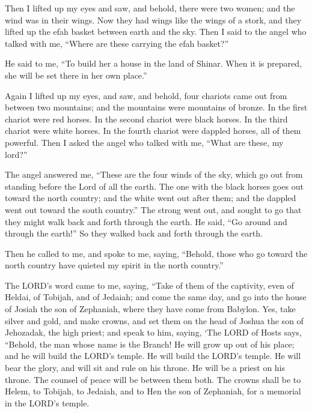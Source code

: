 \myverse{}Then I lifted up my eyes and saw, and behold, there were two women;
and the wind was in their wings. Now they had wings like the wings of a stork, and they lifted up the
efah basket between earth and the sky.
\myverse{}Then I said to the angel who talked with me, “Where are these carrying the
efah basket?”

\myverse{}He said to me, “To build her a house in the land of Shinar. When
it is prepared, she will be set there in her own place.”


\mychapter{} \myverse*{}Again I lifted up my eyes, and saw, and behold, four chariots came
out from between two mountains; and the mountains were mountains of bronze.
\myverse{}In the first chariot were red horses. In the second chariot were black horses.
\myverse{}In the third chariot were white horses. In the fourth chariot were dappled horses,
all of them powerful.
\myverse{}Then I asked the angel who talked with me, “What are these, my lord?”

\myverse{}The angel answered me, “These are the four winds of the sky, which
go out from standing before the Lord of all the earth.
\myverse{}The one with the black horses goes out toward the north country; and the white
went out after them; and the dappled went out toward the south country.”
\myverse{}The strong went out, and sought to go that they might walk back and forth through
the earth. He said, “Go around and through the earth!” So they walked back and forth through the earth.

\myverse{}Then he called to me, and spoke to me, saying, “Behold, those who
go toward the north country have quieted my spirit in the north country.”

\myverse{}The LORD’s word came to me, saying,
\myverse{}“Take of them of the captivity, even of Heldai, of Tobijah, and of Jedaiah;
and come the same day, and go into the house of Josiah the son of Zephaniah, where they have come from
Babylon.
\myverse{}Yes, take silver and gold, and make crowns, and set them on the head of Joshua
the son of Jehozadak, the high priest;
\myverse{}and speak to him, saying, ‘The LORD of Hosts says, “Behold, the man whose
name is the Branch! He will grow up out of his place; and he will build the LORD’s temple.
\myverse{}He will build the LORD’s temple. He will bear the glory, and will sit and
rule on his throne. He will be a priest on his throne. The counsel of peace will be between them both.
\myverse{}The crowns shall be to Helem, to Tobijah, to Jedaiah, and to Hen the son of
Zephaniah, for a memorial in the LORD’s temple.

